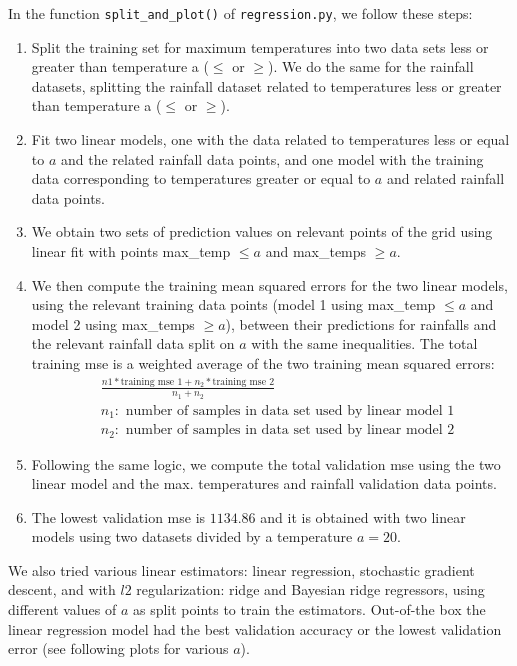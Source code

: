 \documentclass[12pt,twoside]{article}
\begin{document}
\begin{enumerate}
\begin{enumerate}
	In the function  \verb|split_and_plot()| of \verb|regression.py|, we follow these steps:
	\begin{enumerate}[(1)]
		\item Split the training set for maximum temperatures into two data sets less or greater than temperature a ($\le$ or $\ge$). 
		We do the same for the rainfall datasets, splitting the rainfall dataset related to temperatures  less or greater than temperature a  ($\le$ or $\ge$). 
		\item Fit two linear models, one with the data related to temperatures less or equal to $a$ and the related rainfall data points, and one model 
		with the training data corresponding to temperatures greater or equal to $a$ and related rainfall data points. 
		\item We obtain two sets of prediction values on relevant points of the grid using linear fit with points max\_temp $\le a$ and max\_temps $\ge a$.
		\item We then compute the training mean squared errors for the two linear models, 
		using the relevant training data points (model 1 using max\_temp $\le a$ and  model 2 using max\_temps $\ge a$), between their predictions for rainfalls
		and the relevant rainfall data split on $a$ with the same inequalities. 
		The total training mse is a weighted average of the two training mean squared errors: 
		\begin{align*}
			& \frac{n1 * \text{training mse  1} + n_2  * \text{training mse 2}} {n_1 + n_2} \\
			& n_1: \text{ number of samples in data set used by linear model 1} \\
			& n_2: \text{ number of samples in data set used by linear model 2}
		\end{align*}
		\item  Following the same logic, we compute the total validation mse using the two linear model and the max. temperatures and rainfall validation data points.
		\item The lowest validation mse is $1134.86$ and it is obtained with two linear models using two datasets divided by a temperature $a=20$.

	\end{enumerate}	
 	We also tried various linear estimators: linear regression, stochastic gradient descent, and with $l2$ regularization: ridge and Bayesian ridge regressors, 
	using different values of $a$ as split points to train the estimators.
	Out-of-the box the linear regression model had the best validation accuracy or the lowest validation error (see following plots for various $a$).
	

\end{enumerate}
\end{enumerate}
\end{document}
